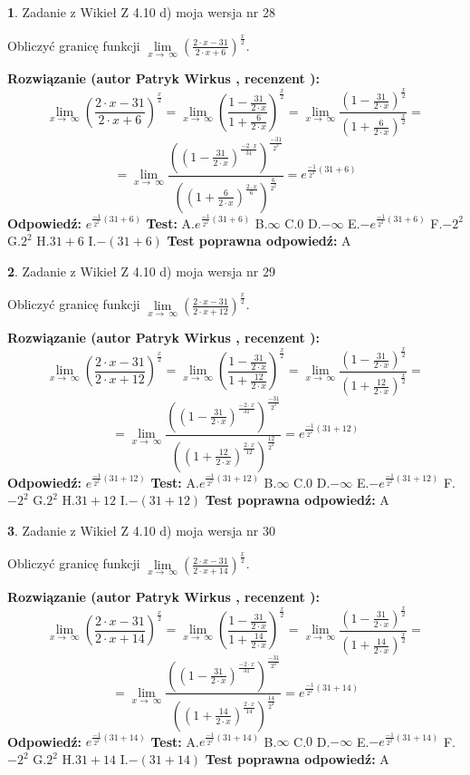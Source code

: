 \documentclass[12pt, a4paper]{article}
\theoremstyle{definition} %
\newtheorem{zad}{}
\newcommand{\zadStart}[1]{\begin{zad}#1\newline}
\newcommand{\zadStop}{\end{zad}}
\newcommand{\rozwStart}[2]{\noindent \textbf{Rozwiązanie (autor #1 , recenzent #2): }\newline}
\newcommand{\rozwStop}{\newline}
\newcommand{\odpStart}{\noindent \textbf{Odpowiedź:}\newline}
\newcommand{\odpStop}{\newline}
\newcommand{\testStart}{\noindent \textbf{Test:}\newline}
\newcommand{\testStop}{\newline}
\newcommand{\kluczStart}{\noindent \textbf{Test poprawna odpowiedź:}\newline}
\newcommand{\kluczStop}{\newline}
\begin{document}
\zadStart{Zadanie z Wikieł Z 4.10 d) moja wersja nr 28}


Obliczyć granicę funkcji  $\lim\limits_{x\to\ \infty}(\frac{2\cdot x-31}{2\cdot x+6})^{\frac{x}{2}}$.
\zadStop
\rozwStart{Patryk Wirkus}{}
$$\lim\limits_{x\to\ \infty}(\frac{2\cdot x-31}{2\cdot x+6})^{\frac{x}{2}} = \lim\limits_{x\to\ \infty}(\frac{1-\frac{31}{2\cdot x}}{1+\frac{6}{2\cdot x}})^{\frac{x}{2}}=\lim\limits_{x\to\ \infty}\frac{(1-\frac{31}{2\cdot x})^{\frac{x}{2}}}{(1+\frac{6}{2\cdot x})^{\frac{x}{2}}}=$$
$$=\lim\limits_{x\to\ \infty}\frac{((1-\frac{31}{2\cdot x})^{\frac{-2\cdot x}{31}})^{\frac{-31}{2^{2}}}}{((1+\frac{6}{2\cdot x})^{\frac{2\cdot x}{6}})^{\frac{6}{2^{2}}}}=e^{\frac{-1}{2^{2}}(31+6)}$$
\rozwStop
\odpStart
$e^{\frac{-1}{2^{2}}(31+6)}$
\odpStop
\testStart
A.$e^{\frac{-1}{2^{2}}(31+6)}$ B.$\infty$ C.$0$ D.$-\infty$ E.$-e^{\frac{-1}{2^{2}}(31+6)}$
F.$-2^{2}$ G.$2^{2}$
H.$31+6$
I.$-(31+6)$
\testStop
\kluczStart
A
\kluczStop



\zadStart{Zadanie z Wikieł Z 4.10 d) moja wersja nr 29}


Obliczyć granicę funkcji  $\lim\limits_{x\to\ \infty}(\frac{2\cdot x-31}{2\cdot x+12})^{\frac{x}{2}}$.
\zadStop
\rozwStart{Patryk Wirkus}{}
$$\lim\limits_{x\to\ \infty}(\frac{2\cdot x-31}{2\cdot x+12})^{\frac{x}{2}} = \lim\limits_{x\to\ \infty}(\frac{1-\frac{31}{2\cdot x}}{1+\frac{12}{2\cdot x}})^{\frac{x}{2}}=\lim\limits_{x\to\ \infty}\frac{(1-\frac{31}{2\cdot x})^{\frac{x}{2}}}{(1+\frac{12}{2\cdot x})^{\frac{x}{2}}}=$$
$$=\lim\limits_{x\to\ \infty}\frac{((1-\frac{31}{2\cdot x})^{\frac{-2\cdot x}{31}})^{\frac{-31}{2^{2}}}}{((1+\frac{12}{2\cdot x})^{\frac{2\cdot x}{12}})^{\frac{12}{2^{2}}}}=e^{\frac{-1}{2^{2}}(31+12)}$$
\rozwStop
\odpStart
$e^{\frac{-1}{2^{2}}(31+12)}$
\odpStop
\testStart
A.$e^{\frac{-1}{2^{2}}(31+12)}$ B.$\infty$ C.$0$ D.$-\infty$ E.$-e^{\frac{-1}{2^{2}}(31+12)}$
F.$-2^{2}$ G.$2^{2}$
H.$31+12$
I.$-(31+12)$
\testStop
\kluczStart
A
\kluczStop



\zadStart{Zadanie z Wikieł Z 4.10 d) moja wersja nr 30}


Obliczyć granicę funkcji  $\lim\limits_{x\to\ \infty}(\frac{2\cdot x-31}{2\cdot x+14})^{\frac{x}{2}}$.
\zadStop
\rozwStart{Patryk Wirkus}{}
$$\lim\limits_{x\to\ \infty}(\frac{2\cdot x-31}{2\cdot x+14})^{\frac{x}{2}} = \lim\limits_{x\to\ \infty}(\frac{1-\frac{31}{2\cdot x}}{1+\frac{14}{2\cdot x}})^{\frac{x}{2}}=\lim\limits_{x\to\ \infty}\frac{(1-\frac{31}{2\cdot x})^{\frac{x}{2}}}{(1+\frac{14}{2\cdot x})^{\frac{x}{2}}}=$$
$$=\lim\limits_{x\to\ \infty}\frac{((1-\frac{31}{2\cdot x})^{\frac{-2\cdot x}{31}})^{\frac{-31}{2^{2}}}}{((1+\frac{14}{2\cdot x})^{\frac{2\cdot x}{14}})^{\frac{14}{2^{2}}}}=e^{\frac{-1}{2^{2}}(31+14)}$$
\rozwStop
\odpStart
$e^{\frac{-1}{2^{2}}(31+14)}$
\odpStop
\testStart
A.$e^{\frac{-1}{2^{2}}(31+14)}$ B.$\infty$ C.$0$ D.$-\infty$ E.$-e^{\frac{-1}{2^{2}}(31+14)}$
F.$-2^{2}$ G.$2^{2}$
H.$31+14$
I.$-(31+14)$
\testStop
\kluczStart
A
\kluczStop
\end{document}
